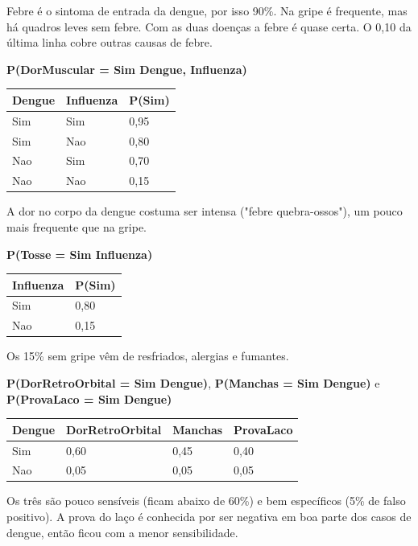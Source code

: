 \documentclass[12pt, a4paper]{article}
\begin{document}
Febre é o sintoma de entrada da dengue, por isso 90\%. Na gripe é frequente, mas há quadros leves sem febre. Com as duas doenças a febre é quase certa. O 0,10 da última linha cobre outras causas de febre.

\textbf{P(DorMuscular = Sim \textbar{} Dengue, Influenza)}

\begin{longtable}{@{}lll@{}}
\toprule\noalign{}
Dengue & Influenza & P(Sim\allowbreak ) \\
\midrule\noalign{}
\endhead
\bottomrule\noalign{}
\endlastfoot
Sim & Sim & 0,95 \\
Sim & Nao & 0,80 \\
Nao & Sim & 0,70 \\
Nao & Nao & 0,15 \\
\end{longtable}

A dor no corpo da dengue costuma ser intensa ("febre quebra-ossos"), um pouco mais frequente que na gripe.

\textbf{P(Tosse = Sim \textbar{} Influenza)}

\begin{longtable}{@{}ll@{}}
\toprule\noalign{}
Influenza & P(Sim\allowbreak ) \\
\midrule\noalign{}
\endhead
\bottomrule\noalign{}
\endlastfoot
Sim & 0,80 \\
Nao & 0,15 \\
\end{longtable}

Os 15\% sem gripe vêm de resfriados, alergias e fumantes.

\textbf{P(Dor\allowbreak Retro\allowbreak Orbital = Sim \textbar{} Dengue)}, \textbf{P(Manchas = Sim \textbar{} Dengue)} e \textbf{P(Prova\allowbreak Laco = Sim \textbar{} Dengue)}

\begin{longtable}{@{}llll@{}}
\toprule\noalign{}
Dengue & DorRetroOrbital & Manchas & ProvaLaco \\
\midrule\noalign{}
\endhead
\bottomrule\noalign{}
\endlastfoot
Sim & 0,60 & 0,45 & 0,40 \\
Nao & 0,05 & 0,05 & 0,05 \\
\end{longtable}

Os três são pouco sensíveis (ficam abaixo de 60\%) e bem específicos (5\% de falso positivo). A prova do laço é conhecida por ser negativa em boa parte dos casos de dengue, então ficou com a menor sensibilidade.
\end{document}

